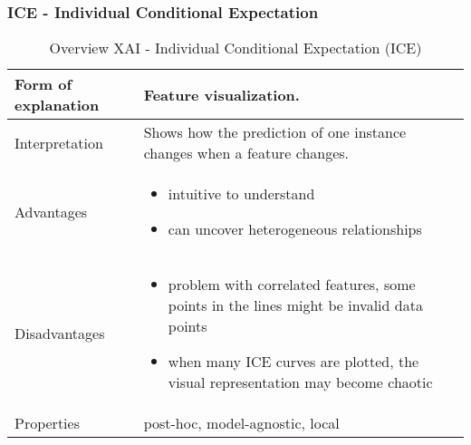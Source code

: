 \subsubsection{ICE - Individual Conditional Expectation}
\begin{table}[H]
  \centering
  \begin{tabular}{|p{}|p{}|}
    \hline
    Form of \newline explanation & 
    Feature visualization. \\
    
    \hline
    Interpretation & 
    Shows how the prediction of one instance changes when a feature changes.\\
    \hline
    Advantages &
    \begin{itemize}[nosep, left=0em]
        \item intuitive to understand
        \item can uncover heterogeneous relationships
    \end{itemize} \\
    
    \hline
    Disadvantages &
    \begin{itemize}[nosep, left=0em]
        \item problem with correlated features, some points in the lines might be invalid data points
        \item when many ICE curves are plotted, the visual representation may become chaotic
    \end{itemize} \\
    
    \hline
    Properties & 
    post-hoc, model-agnostic, local  \\
    
    \hline
  \end{tabular}
  \caption{Overview XAI - Individual Conditional Expectation (ICE)}
  \label{tab:XAIICE}
\end{table}

